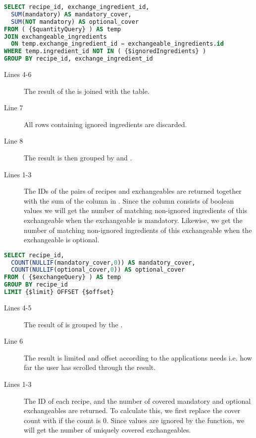 \begin{lstlisting}[language=SQL, float=h, label={}, caption={\$exchangeQuery, get the number of times the individual exchangeable appear in each recipe.}]
SELECT recipe_id, exchange_ingredient_id,
  SUM(mandatory) AS mandatory_cover,
  SUM(NOT mandatory) AS optional_cover
FROM ( {$quantityQuery} ) AS temp
JOIN exchangeable_ingredients
  ON temp.exchange_ingredient_id = exchangeable_ingredients.id
WHERE temp.ingredient_id NOT IN ( {$ignoredIngredients} )
GROUP BY recipe_id, exchange_ingredient_id
\end{lstlisting}

\begin{description}
\item[Lines 4-6] The result of the  is joined with the  table.
\item[Line 7] All rows containing ignored ingredients are discarded.
\item[Line 8] The result is then grouped by  and .
\item[Lines 1-3] The IDs of the pairs of recipes and exchangeables are returned together with the sum of the  column in . Since the  column consists of boolean values we will get the number of matching non-ignored ingredients of this exchangeable when the exchangeable is mandatory. Likewise, we get the number of matching non-ignored ingredients of this exchangeable when the exchangeable is optional.
\end{description}



\begin{lstlisting}[language=SQL, morekeywords={NULLIF,OFFSET}, float=h, label={}, caption={\$coverQuery, get the exchangeable cover counts.}]
SELECT recipe_id,
  COUNT(NULLIF(mandatory_cover,0)) AS mandatory_cover,
  COUNT(NULLIF(optional_cover,0)) AS optional_cover
FROM ( {$exchangeQuery} ) AS temp
GROUP BY recipe_id
LIMIT {$limit} OFFSET {$offset}
\end{lstlisting}

\begin{description}
\item[Lines 4-5] The result of  is grouped by the .
\item[Line 6] The result is limited and offset according to the applications needs i.e. how far the user has scrolled through the result.
\item[Lines 1-3] The ID of each recipe, and the number of covered mandatory and optional exchangeables are returned. To calculate this, we first replace the cover count with  if the count is 0. Since  values are ignored by the  function, we will get the number of uniquely covered exchangeables.
\end{description}



